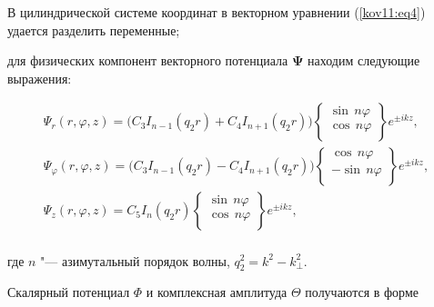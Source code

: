 В цилиндрической системе координат в векторном уравнении (\ref{kov11:eq4}) удается разделить переменные;

для физических компонент векторного потенциала $\boldsymbol\Psi$ находим следующие выражения:

\begin{equation}\label{kov11:eq7}

\begin{array}{l}

 \Psi _r (r,\varphi ,z) = \bigl( {C_3 I_{n - 1} (q_2 r) + C_4 I_{n + 1} (q_2 r)} \bigr)\left\{ \begin{array}{l}

 \sin \,n\varphi  \\

 \cos \,n\varphi  \\

 \end{array} \right\}e^{ \pm ikz} , \\

 \Psi _\varphi  (r,\varphi ,z) = \bigl( {C_3 I_{n - 1} (q_2 r) - C_4 I_{n + 1} (q_2 r)} \bigr)\left\{ \begin{array}{l}

 \cos \,n\varphi  \\

  - \sin \,n\varphi  \\

 \end{array} \right\}e^{ \pm ikz} , \\

 \Psi _z (r,\varphi ,z) = C_5 I_n (q_2 r)\left\{ \begin{array}{l}

 \sin \,n\varphi  \\

 \cos \,n\varphi  \\

 \end{array} \right\}e^{ \pm ikz} , \\

 \end{array}

\end{equation}

где $n$ "--- азимутальный порядок волны, $q_2^2  = k^2  - k_ \bot ^2$.

Скалярный потенциал $\Phi$ и комплексная амплитуда $\Theta$ получаются в форме

